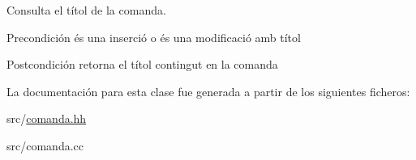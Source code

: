 Consulta el títol de la comanda. 

\begin{DoxyPrecond}{Precondición}
és una inserció o és una modificació amb títol 
\end{DoxyPrecond}
\begin{DoxyPostcond}{Postcondición}
retorna el títol contingut en la comanda 
\end{DoxyPostcond}


La documentación para esta clase fue generada a partir de los siguientes ficheros\+:\begin{DoxyCompactItemize}
\item 
src/\hyperlink{comanda_8hh}{comanda.\+hh}\item 
src/comanda.\+cc\end{DoxyCompactItemize}
